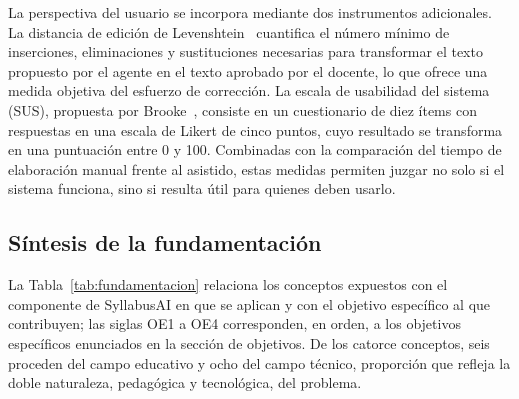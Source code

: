 La perspectiva del usuario se incorpora mediante dos instrumentos adicionales. La distancia de edición de Levenshtein~\cite{levenshtein1966} cuantifica el número mínimo de inserciones, eliminaciones y sustituciones necesarias para transformar el texto propuesto por el agente en el texto aprobado por el docente, lo que ofrece una medida objetiva del esfuerzo de corrección. La escala de usabilidad del sistema (SUS), propuesta por Brooke~\cite{brooke1996sus}, consiste en un cuestionario de diez ítems con respuestas en una escala de Likert de cinco puntos, cuyo resultado se transforma en una puntuación entre 0 y 100. Combinadas con la comparación del tiempo de elaboración manual frente al asistido, estas medidas permiten juzgar no solo si el sistema funciona, sino si resulta útil para quienes deben usarlo.

\subsection{Síntesis de la fundamentación}
La Tabla~\ref{tab:fundamentacion} relaciona los conceptos expuestos con el componente de SyllabusAI en que se aplican y con el objetivo específico al que contribuyen; las siglas OE1 a OE4 corresponden, en orden, a los objetivos específicos enunciados en la sección de objetivos. De los catorce conceptos, seis proceden del campo educativo y ocho del campo técnico, proporción que refleja la doble naturaleza, pedagógica y tecnológica, del problema.


